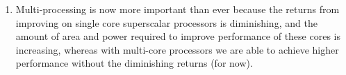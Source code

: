 


\begin{enumerate}[label=(\alph*)]

  \item

    Multi-processing is now more important than ever because the returns from improving on single core superscalar processors is diminishing, and the amount of area and power required to improve performance of these cores is increasing, whereas with multi-core processors we are able to achieve higher performance without the diminishing returns (for now).
        
    \end{enumerate}

